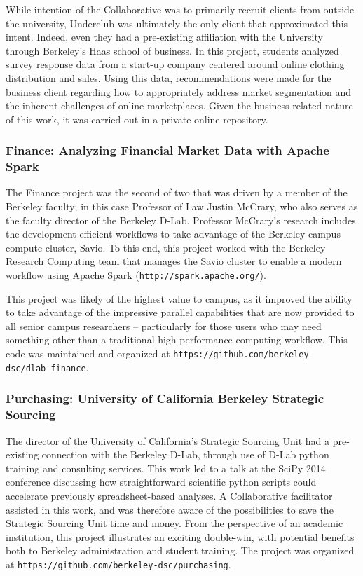 \documentclass[12pt]{article}
\begin{document}
While intention of the Collaborative was to primarily recruit clients from outside the university, Underclub was ultimately the only client that approximated this intent. Indeed, even they had a pre-existing affiliation with the University through Berkeley's Haas school of business.  In this project, students analyzed survey response data from a start-up company centered around online clothing distribution and sales.  Using this data, recommendations were made for the business client regarding how to appropriately address market segmentation and the inherent challenges of online marketplaces.  Given the business-related nature of this work, it was carried out in a private online repository.

\subsubsection*{Finance: Analyzing Financial Market Data with Apache Spark}

The Finance project was the second of two that was driven by a member of the Berkeley faculty; in this case Professor of Law Justin McCrary, who also serves as the faculty director of the Berkeley D-Lab. Professor McCrary's research includes the development efficient workflows to take advantage of the Berkeley campus compute cluster, Savio. To this end, this project worked with the Berkeley Research Computing team that manages the Savio cluster to enable a modern workflow using Apache Spark (\texttt{http://spark.apache.org/}).

This project was likely of the highest value to campus, as it improved the ability to take advantage of the impressive parallel capabilities that are now provided to all senior campus researchers -- particularly for those users who may need something other than a traditional high performance computing workflow. This code was maintained and organized at \texttt{https://github.com/berkeley-dsc/dlab-finance}.

\subsubsection*{Purchasing: University of California Berkeley Strategic Sourcing}

The director of the University of California's Strategic Sourcing Unit had a pre-existing connection with the Berkeley D-Lab, through use of D-Lab python training and consulting services. This work led to a talk at the SciPy 2014 conference discussing how straightforward scientific python scripts could accelerate previously spreadsheet-based analyses. A Collaborative facilitator assisted in this work, and was therefore aware of the possibilities to save the Strategic Sourcing Unit time and money. From the perspective of an academic institution, this project illustrates an exciting double-win, with potential benefits both to Berkeley administration and student training.  The project was organized at \texttt{https://github.com/berkeley-dsc/purchasing}.
\end{document}
